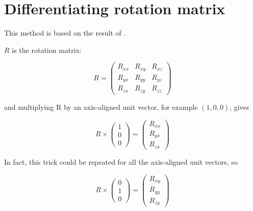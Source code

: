 \documentclass[12pt,a4paper,twoside,openright]{report}
\begin{document}

\appendix

\chapter{Differentiating rotation matrix}\label{rotlbl}

This method is based on the result of \cite{zhao2016time}.

$R$ is the rotation matrix:

\begin{equation}
    R = \begin{pmatrix}
        R_{xx} & R_{xy} & R_{xz} \\
        R_{yx} & R_{yy} & R_{yz} \\
        R_{zx} & R_{zy} & R_{zz}
    \end{pmatrix}
\end{equation}

and multiplying R by an axis-aligned unit vector, for example $(1, 0, 0)$, gives

\begin{equation}
R \times\begin{pmatrix}
    1 \\
    0 \\
    0
    \end{pmatrix}
    =
    \begin{pmatrix}
    R_{xx} \\
    R_{yx} \\
    R_{zx}
    \end{pmatrix}
\end{equation}

In fact, this trick could be repeated for all the axis-aligned unit vectors, so

\begin{equation}
    R \times\begin{pmatrix}
        0 \\
        1 \\
        0
        \end{pmatrix}
        =
        \begin{pmatrix}
        R_{xy} \\
        R_{yy} \\
        R_{zy}
        \end{pmatrix}
    \end{equation}
\end{document}
